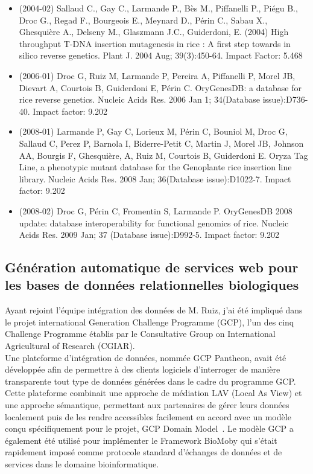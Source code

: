 \begin{itemize}

\item (2004-02) Sallaud C., Gay C., Larmande P., Bès M., Piffanelli P., Piégu B., Droc G., Regad F., Bourgeois E., Meynard D., Périn C., Sabau X., Ghesquière A., Delseny M., Glaszmann J.C., Guiderdoni, E. (2004) High throughput T-DNA insertion mutagenesis in rice : A first step towards in silico reverse genetics. Plant J. 2004 Aug; 39(3):450-64. Impact Factor: 5.468      
\item (2006-01) Droc G, Ruiz M, Larmande P, Pereira A, Piffanelli P, Morel JB, Dievart A, Courtois B, Guiderdoni E, Périn C. OryGenesDB: a database for rice reverse genetics. Nucleic Acids Res. 2006 Jan 1; 34(Database issue):D736-40. Impact factor: 9.202
\item (2008-01) Larmande P, Gay C, Lorieux M, Périn C, Bouniol M, Droc G, Sallaud C, Perez P, Barnola I, Biderre-Petit C, Martin J, Morel JB, Johnson AA, Bourgis F, Ghesquière, A, Ruiz M, Courtois B, Guiderdoni E. Oryza Tag Line, a phenotypic mutant database for the Genoplante rice insertion line library. Nucleic Acids Res. 2008 Jan; 36(Database issue):D1022-7. Impact factor: 9.202 
\item (2008-02) Droc G, Périn C, Fromentin S, Larmande P. OryGenesDB 2008 update: database interoperability for functional genomics of rice. Nucleic Acids Res. 2009 Jan; 37 (Database issue):D992-5. Impact factor: 9.202

\end{itemize}

\subsection*{Génération automatique de services web pour les bases de données relationnelles biologiques}
\label{SWS}

Ayant rejoint l’équipe intégration des données de M. Ruiz, j’ai été impliqué dans le projet international Generation Challenge Programme (GCP), l’un des cinq Challenge Programme établis par le Consultative Group on International Agricultural of Research (CGIAR).  \\ %

Une plateforme d’intégration de données, nommée GCP Pantheon, avait été développée afin de permettre à des clients logiciels d’interroger de manière transparente tout type de données générées dans le cadre du programme GCP. Cette plateforme combinait une approche de médiation LAV (Local As View) et une approche sémantique, permettant aux partenaires de gérer leurs données localement puis de les rendre accessibles facilement en accord avec un modèle conçu spécifiquement pour le projet, GCP Domain Model~\cite{Bruskiewich2006,Bruskiewich2008}. Le modèle GCP a également été utilisé pour implémenter le Framework BioMoby qui s’était rapidement imposé comme protocole standard d’échanges de données et de services dans le domaine bioinformatique.\\

